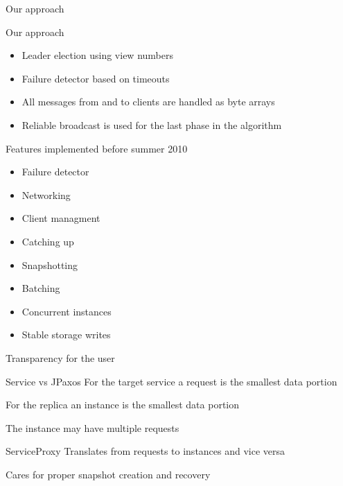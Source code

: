 \documentclass[hyperref={pdfpagelabels=true},11pt,compress,trans]{beamer}
\begin{document}
\begin{frame}{Our approach}
  \begin{block}{Our approach}
    \vspace{-1em}\vspace{-\parskip}\vspace{-\lineskip}
    \begin{itemize}
      \item Leader election using view numbers
      \item Failure detector based on timeouts
      \item All messages from and to clients are handled as byte arrays
      \item Reliable broadcast is used for the last phase in the algorithm
    \end{itemize}
  \end{block}
\end{frame}

\begin{frame}{Features implemented before summer 2010}
 \begin{block}{}
    \vspace{-1em}\vspace{-\parskip}\vspace{-\lineskip}
    \begin{itemize}
      \item Failure detector
      \item Networking
      \item Client managment
      \item Catching up
      \item Snapshotting
      \item Batching
      \item Concurrent instances
      \item Stable storage writes
    \end{itemize}
  \end{block}
\end{frame}

\begin{frame}{Transparency for the user}
 \begin{block}{Service vs JPaxos}
  For the target service a request is the smallest data portion
  
  For the replica an instance is the smallest data portion
  
  The instance may have multiple requests
 \end{block}

 \begin{block}{ServiceProxy}
  Translates from requests to instances and vice versa
  
  Cares for proper snapshot creation and recovery
 \end{block}
\end{frame}
\end{document}
